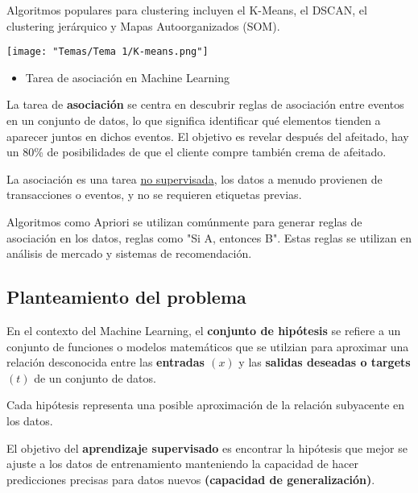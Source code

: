 Algoritmos populares para clustering incluyen el K-Means, el DSCAN, el clustering jerárquico y Mapas Autoorganizados (SOM).

\begin{center}
\texttt{[image: "Temas/Tema 1/K-means.png"]}
\end{center}
\begin{itemize}[label=\color{red}\textbullet, leftmargin=*]
	\item \color{lightblue}Tarea de asociación en Machine Learning
\end{itemize}

La tarea de \textbf{asociación} se centra en descubrir reglas de asociación entre eventos en un conjunto de datos, lo que significa identificar qué elementos tienden a aparecer juntos en dichos eventos. El objetivo es revelar después del afeitado, hay un 80\% de posibilidades de que el cliente compre también crema de afeitado.

La asociación es una tarea \underline{no supervisada}, los datos a menudo provienen de transacciones o eventos, y no se requieren etiquetas previas.

Algoritmos como Apriori se utilizan comúnmente para generar reglas de asociación en los datos, reglas como "Si A, entonces B". Estas reglas se utilizan en análisis de mercado y sistemas de recomendación.
\subsection{Planteamiento del problema}
En el contexto del Machine Learning, el \textbf{conjunto de hipótesis} se refiere a un conjunto de funciones o modelos matemáticos que se utilzian para aproximar una relación desconocida entre las \textbf{entradas $(x)$} y las \textbf{salidas deseadas o targets $(t)$} de un conjunto de datos.

Cada hipótesis representa una posible aproximación de la relación subyacente en los datos.

El objetivo del \textbf{aprendizaje supervisado} es encontrar la hipótesis que mejor se ajuste a los datos de entrenamiento manteniendo la capacidad de hacer predicciones precisas para datos nuevos \textbf{(capacidad de generalización)}.

\begin{center}
\end{center}
